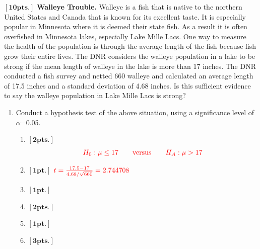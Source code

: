 \item $\mathbf{[10pts.]}$ \textbf{Walleye Trouble.} Walleye is a fish that is native to the northern United States and Canada that is known for its excellent taste. It is especially popular in Minnesota where it is deemed their state fish. As a result it is often overfished in Minnesota lakes, especially Lake Mille Lacs. One way to measure the health of the population is through the average length of the fish  because fish grow their entire lives. The DNR considers the walleye population in a lake to be strong if the mean length of walleye in the lake is more than 17 inches. The DNR conducted a fish survey and netted 660 walleye and calculated an average length of 17.5 inches and a standard deviation of 4.68 inches. Is this sufficient evidence to say the walleye population in Lake Mille Lacs is strong?  

  \begin{enumerate}
  \item Conduct a hypothesis test of the above situation, using a significance level of $\alpha$=0.05.
    \begin{enumerate}
    \item  $\mathbf{[2pts.]}$ $${\color{red} H_0: \mu \leq 17 \qquad \mbox{versus} \qquad H_A: \mu > 17}$$

    \item $\mathbf{[1pt.]}$ ${\color{red} t = \frac{17.5-17}{4.68/\sqrt{660}} = 2.744708}$
\item $\mathbf{[1pt.]}$ 
\item $\mathbf{[2pts.]}$ 


 \item $\mathbf{[1pt.]}$ 
\item $\mathbf{[3pts.]}$ 


    \end{enumerate}

  \end{enumerate}
